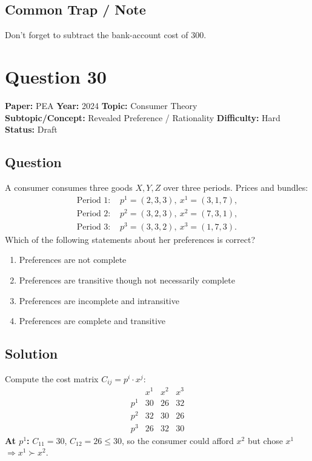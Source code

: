 \documentclass[11pt]{article}
\begin{document}
\subsection*{Common Trap / Note}
Don't forget to subtract the bank-account cost of $300$.

\section*{Question 30}
\textbf{Paper:} PEA \quad \textbf{Year:} 2024 \quad \textbf{Topic:} Consumer Theory \\
\textbf{Subtopic/Concept:} Revealed Preference / Rationality \quad \textbf{Difficulty:} Hard \quad \textbf{Status:} Draft

\subsection*{Question}
A consumer consumes three goods $X,Y,Z$ over three periods. Prices and bundles:
\[
\begin{aligned}
\text{Period 1: } & p^{1}=(2,3,3),\ x^{1}=(3,1,7),\\
\text{Period 2: } & p^{2}=(3,2,3),\ x^{2}=(7,3,1),\\
\text{Period 3: } & p^{3}=(3,3,2),\ x^{3}=(1,7,3).
\end{aligned}
\]
Which of the following statements about her preferences is correct?
\begin{enumerate}[label=(\Alph*)]
\item Preferences are not complete
\item Preferences are transitive though not necessarily complete
\item Preferences are incomplete and intransitive
\item Preferences are complete and transitive
\end{enumerate}

\subsection*{Solution}
Compute the cost matrix $C_{ij}=p^{i}\cdot x^{j}$:
\[
\begin{array}{c|ccc}
 & x^{1} & x^{2} & x^{3}\\\hline
p^{1} & 30 & 26 & 32\\
p^{2} & 32 & 30 & 26\\
p^{3} & 26 & 32 & 30
\end{array}
\]
\textbf{At $p^{1}$:} $C_{11}=30$, $C_{12}=26\le 30$, so the consumer could afford $x^{2}$ but chose $x^{1}$ $\Rightarrow x^{1}\succ x^{2}$.
\end{document}
